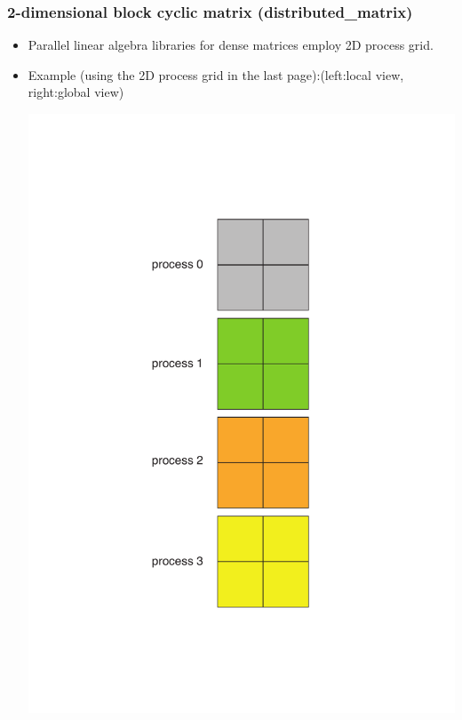 \begin{frame}
  \frametitle{2-dimensional block cyclic matrix (distributed_matrix)}
  \begin{itemize}
  \item Parallel linear algebra libraries for dense matrices employ 2D process grid.
  \item Example (using the 2D process grid in the last page):(left:local view, right:global view)
  \begin{center}
    \includegraphics[height=0.45\textheight]{figure/local-view.pdf} \ \ \ \ \ \ \ \

\end{center}
\end{itemize}
\end{frame}
